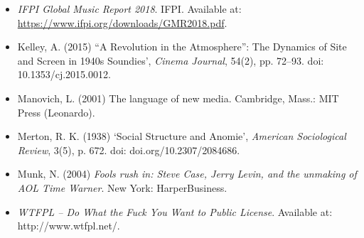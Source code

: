 \documentclass[a4paper, 11pt]{article}
\begin{document}
\begin{itemize}
	\item[] \emph{IFPI Global Music Report 2018}. IFPI. Available at: \url{https://www.ifpi.org/downloads/GMR2018.pdf}.


	\item[] Kelley, A. (2015) ``A Revolution in the Atmosphere'': The Dynamics of
Site and Screen in 1940s Soundies', \emph{Cinema Journal}, 54(2), pp.
72--93. doi: 10.1353/cj.2015.0012.



   \item [] Manovich, L. (2001) The language of new media. Cambridge, Mass.: MIT Press (Leonardo).


	\item[] Merton, R. K. (1938) `Social Structure and Anomie', \emph{American Sociological Review}, 3(5), p. 672. doi: doi.org/10.2307/2084686.



	\item[] Munk, N. (2004) \emph{Fools rush in: Steve Case, Jerry Levin, and the unmaking of AOL Time Warner}. New York: HarperBusiness.

%
%

	\item[] \emph{WTFPL -- Do What the Fuck You Want to Public License}. Available at: http://www.wtfpl.net/.
\end{itemize}
%
 
\end{document}
